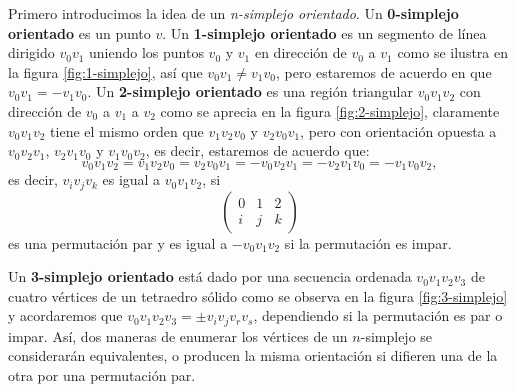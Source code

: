 \documentclass[12pt]{book}
\theoremstyle{definition}
\newcounter{in}
\begin{document}
Primero introducimos la idea de un \emph{n-simplejo orientado}. Un
\textbf{0-simplejo orientado} es un punto $v$. Un \textbf{1-simplejo
  orientado} es un segmento de línea dirigido $v_{0}v_{1}$ uniendo los
puntos $v_{0}$ y $v_{1}$ en dirección de $v_{0}$ a $v_{1}$ como se
ilustra en la figura \ref{fig:1-simplejo}, así que
$v_{0}v_{1}\neq v_{1}v_{0}$, pero estaremos de acuerdo en que~$v_{0}v_{1}=-v_{1}v_{0}$. Un \textbf{2-simplejo orientado} es una
región triangular $v_{0}v_{1}v_{2}$ con dirección de $v_{0}$ a $v_{1}$
a $v_{2}$ como se aprecia en la figura \ref{fig:2-simplejo}, claramente~$v_{0}v_{1}v_{2}$ tiene el mismo orden que
$v_{1}v_{2}v_{0}$ y $v_{2}v_{0}v_{1}$, pero con orientación opuesta a
$v_{0}v_{2}v_{1}$, $v_{2}v_{1}v_{0}$ y $v_{1}v_{0}v_{2}$, es decir, estaremos de acuerdo que:
$$v_{0}v_{1}v_{2}=v_{1}v_{2}v_{0}=v_{2}v_{0}v_{1}=-v_{0}v_{2}v_{1}=-v_{2}v_{1}v_{0}=-v_{1}v_{0}v_{2},$$
es decir, $v_{i}v_{j}v_{k}$ es igual a $v_{0}v_{1}v_{2}$, si
\[ \left(
  \begin{array}{ccc}
    0 & 1 & 2 \\
    i & j & k 
  \end{array} 
\right)\] 
es una permutación par y es igual a $-v_{0}v_{1}v_{2}$ si la
permutación es impar.

Un \textbf{3-simplejo orientado} está dado por una secuencia ordenada
$v_{0}v_{1}v_{2}v_{3}$ de cuatro vértices de un tetraedro sólido
como se observa en la figura \ref{fig:3-simplejo} y
acordaremos que $v_{0}v_{1}v_{2}v_{3}=\pm v_{i}v_{j}v_{r}v_{s}$,
dependiendo si la permutación es par o impar. Así, dos maneras
de enumerar los vértices de un $n$-simplejo se considerarán
equivalentes, o producen la misma orientación si difieren una de la otra
por una permutación par. 
\end{document}
